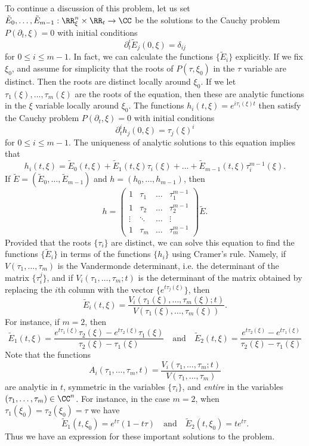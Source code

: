 To continue a discussion of this problem, let us set $\tilde{E}_0, \dots, \tilde{E}_{m-1}: \RR^n_\xi \times \RR_t \to \CC$ be the solutions to the Cauchy problem $P(\partial_t,\xi) = 0$ with initial conditions
%
\[ \partial_t^i \tilde{E}_j(0,\xi) = \delta_{ij} \]
%
for $0 \leq i \leq m-1$. In fact, we can calculate the functions $\{ \tilde{E}_i \}$ explicitly. If we fix $\xi_0$, and assume for simplicity that the roots of $P(\tau,\xi_0)$ in the $\tau$ variable are distinct. Then the roots are distinct locally around $\xi_0$. If we let $\tau_1(\xi),\dots,\tau_m(\xi)$ are the roots of the equation, then these are analytic functions in the $\xi$ variable locally around $\xi_0$. The functions $h_i(t,\xi) = e^{i \tau_i(\xi) t}$ then satisfy the Cauchy problem $P(\partial_t,\xi) = 0$ with initial conditions
%
\[ \partial_t^i h_j(0,\xi) = \tau_j(\xi)^i \]
%
for $0 \leq i \leq m-1$. The uniqueness of analytic solutions to this equation implies that
%
\[ h_i(t,\xi) = \tilde{E}_0(t,\xi) + \tilde{E}_1(t,\xi) \tau_i(\xi) + \dots + \tilde{E}_{m-1}(t,\xi) \tau_i^{m-1}(\xi). \]
%
If $\tilde{E} = (\tilde{E}_0,\dots,\tilde{E}_{m-1})$ and $h = (h_0,\dots,h_{m-1})$, then
%
\[ h = \begin{pmatrix} 1 & \tau_1 & \dots & \tau_1^{m-1} \\ 1 & \tau_2 & \dots & \tau_2^{m-1} \\ \vdots & \ddots & \dots & \vdots \\ 1 & \tau_m & \dots & \tau_m^{m-1} \end{pmatrix} \tilde{E}. \]
%
Provided that the roots $\{ \tau_i \}$ are distinct, we can solve this equation to find the functions $\{ \tilde{E}_i \}$ in terms of the functions $\{ h_i \}$ using Cramer's rule. Namely, if $V(\tau_1,\dots,\tau_m)$ is the Vandermonde determinant, i.e. the determinant of the matrix $\{ \tau_i^j \}$, and if $V_i(\tau_1,\dots,\tau_m;t)$ is the determinant of the matrix obtained by replacing the $i$th column with the vector $\{ e^{t \tau_j(\xi)} \}$, then
%
\[ \tilde{E}_i(t,\xi) = \frac{V_i(\tau_1(\xi),\dots,\tau_m(\xi);t)}{V(\tau_1(\xi),\dots,\tau_m(\xi))}. \]
%
For instance, if $m = 2$, then
%
\[ \tilde{E}_1(t,\xi) = \frac{e^{t \tau_1(\xi)} \tau_2(\xi) - e^{t \tau_2(\xi)} \tau_1(\xi)}{\tau_2(\xi) - \tau_1(\xi)} \quad\text{and}\quad \tilde{E}_2(t,\xi) = \frac{e^{t \tau_2(\xi)} - e^{t \tau_1(\xi)}}{\tau_2(\xi) - \tau_1(\xi)} \]
%
Note that the functions
%
\[ A_i(\tau_1,\dots,\tau_m,t) = \frac{V_i(\tau_1,\dots,\tau_m;t)}{V(\tau_1,\dots,\tau_m)} \]
%
are analytic in $t$, symmetric in the variables $\{ \tau_i \}$, and \emph{entire} in the variables $(\tau_1,\dots,\tau_m) \in \CC^n$. For instance, in the case $m = 2$, when $\tau_1(\xi_0) = \tau_2(\xi_0) = \tau$ we have
%
\[ \tilde{E}_1(t,\xi_0) = e^{t \tau} (1 - t \tau) \quad\text{and}\quad \tilde{E}_2(t,\xi_0) = t e^{t \tau}. \]
%
Thus we have an expression for these important solutions to the problem.

